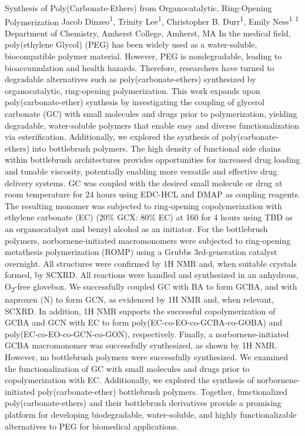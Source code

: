 \makeabstract
    {
    Synthesis of Poly(Carbonate-Ethers) from Organocatalytic, Ring-Opening Polymerization
    }
    {
    Jacob Dinzeo\textsuperscript{1}, Trinity Lee\textsuperscript{1}, Christopher B. Durr\textsuperscript{1}, Emily Ness\textsuperscript{1}
    }
    {
    \textsuperscript{1} Department of Chemistry, Amherst College, Amherst, MA
    }
    {
    In the medical field, poly(ethylene Glycol) (PEG) has been widely used as a water-soluble, biocompatible polymer material. However, PEG is nondegradable, leading to bioaccumulation and health hazards. Therefore, researchers have turned to degradable alternatives such as poly(carbonate-ethers) synthesized by organocatalytic, ring-opening polymerization. This work expands upon poly(carbonate-ether) synthesis by investigating the coupling of glycerol carbonate (GC) with small molecules and drugs prior to polymerization, yielding degradable, water-soluble polymers that enable easy and diverse functionalization via esterification. Additionally, we explored the synthesis of poly(carbonate-ethers) into bottlebrush polymers. The high density of functional side chains within bottlebrush architectures provides opportunities for increased drug loading and tunable viscosity, potentially enabling more versatile and effective drug delivery systems.
    }
    {
    GC was coupled with the desired small molecule or drug at room temperature for 24 hours using EDC-HCL and DMAP as coupling reagents. The resulting monomer was subjected to ring-opening copolymerization with ethylene carbonate (EC) (20\% GCX: 80\% EC) at 160 {\textcelsius} for 4 hours using TBD as an organocatalyst and benzyl alcohol as an initiator. For the bottlebrush polymers, norbornene-initiated macromonomers were subjected to ring-opening metathesis polymerization (ROMP) using a Grubbs 3rd-generation catalyst overnight. All structures were confirmed by 1H NMR and, when suitable crystals formed, by SCXRD. All reactions were handled and synthesized in an anhydrous, O\textsubscript{2}-free glovebox.
    }
    {
    We successfully coupled GC with BA to form GCBA, and with naproxen (N) to form GCN, as evidenced by 1H NMR and, when relevant, SCXRD. In addition, 1H NMR supports the successful copolymerization of GCBA and GCN with EC to form poly(EC-co-EO-co-GCBA-co-GOBA) and poly(EC-co-EO-co-GCN-co-GON), respectively. Finally, a norbornene-initiated GCBA macromonomer was successfully synthesized, as shown by 1H NMR. However, no bottlebrush polymers were successfully synthesized. 
    }
    {
    We examined the functionalization of GC with small molecules and drugs prior to copolymerization with EC. Additionally, we explored the synthesis of norbornene-initiated poly(carbonate-ether) bottlebrush polymers. Together, functionalized poly(carbonate-ethers) and their bottlebrush derivatives provide a promising platform for developing biodegradable, water-soluble, and highly functionalizable alternatives to PEG for biomedical applications.
    }

    \newpage
    